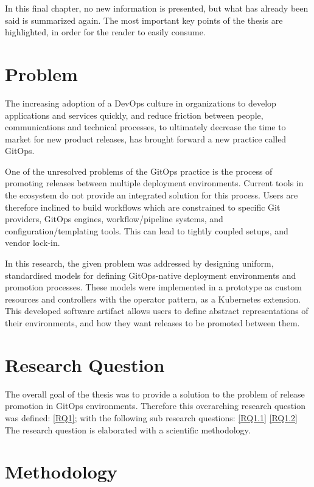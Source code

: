 In this final chapter,
no new information is presented,
but what has already been said is summarized again.
The most important key points of the thesis are highlighted,
in order for the reader to easily consume.

\section*{Problem}

The increasing adoption of a DevOps culture in organizations to develop applications and services quickly,
and reduce friction between people, communications and technical processes,
to ultimately decrease the time to market for new product releases,
has brought forward a new practice called GitOps.

One of the unresolved problems of the GitOps practice is
the process of promoting releases between multiple deployment environments.
Current tools in the ecosystem do not provide an integrated solution for this process.
Users are therefore inclined to build workflows which are constrained to specific
Git providers, GitOps engines,
workflow/pipeline systems, and configuration/templating tools. This can lead to tightly coupled setups,
and vendor lock-in.

In this research,
the given problem was addressed by designing uniform, standardised models for
defining GitOps-native deployment environments and promotion processes.
These models were implemented in a prototype as custom resources and controllers with the
operator pattern, as a Kubernetes extension.
This developed software artifact allows users to define abstract representations
of their environments, and how they want releases to be promoted between them.

\section*{Research Question}

The overall goal of the thesis was to provide a solution to the problem of
release promotion in GitOps environments.
Therefore this overarching research question was defined:
\ref{RQ1};
with the following sub research questions:
\ref{RQ1.1}
\ref{RQ1.2}
The research question is elaborated with a scientific methodology.

\section*{Methodology}

